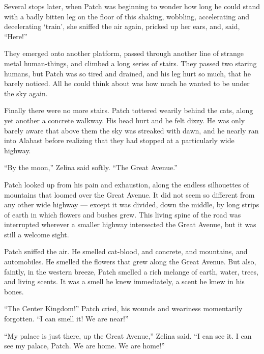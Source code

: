 \documentclass[ebook,oneside,openany,17pt]{memoir}
\newenvironment{tolerant}[1]{%
  \par\tolerance=#1\relax
}{%
  \par
}
\begin{document}
Several stops later, when Patch was beginning to wonder how long he
could stand with a badly bitten leg on the floor of this shaking,
wobbling, accelerating and decelerating ‘train’, she sniffed the air
again, pricked up her ears, and, said, “Here!”

\begin{tolerant}{2000}
They emerged onto another platform, passed through another line of
strange metal human-things, and climbed a long series of stairs. They
passed two staring humans, but Patch was so tired and drained, and his
leg hurt so much, that he barely noticed. All he could think about was
how much he wanted to be under the sky again.
\end{tolerant}

Finally there were no more stairs. Patch tottered wearily behind the
cats, along yet another a concrete walkway. His head hurt and he felt
dizzy. He was only barely aware that above them the sky was streaked
with dawn, and he nearly ran into Alabast before realizing that they
had stopped at a particularly wide highway.

“By the moon,” Zelina said softly. “The Great Avenue.”

\begin{tolerant}{2000}
Patch looked up from his pain and exhaustion, along the endless
silhouettes of mountains that loomed over the Great Avenue. It did not
seem so different from any other wide highway — except it was divided,
down the middle, by long strips of earth in which flowers and bushes
grew. This living spine of the road was interrupted wherever a smaller
highway intersected the Great Avenue, but it was still a welcome
sight.
\end{tolerant}

\begin{tolerant}{1000}
Patch sniffed the air. He smelled cat-blood, and concrete, and
mountains, and automobiles. He smell\-ed the flowers that grew along the
Great Avenue. But also, faintly, in the western breeze, Patch smelled
a rich melange of earth, water, trees, and living scents. It was a
smell he knew immediately, a scent he knew in his bones.
\end{tolerant}

“The Center Kingdom!” Patch cried, his wounds and weariness
momentarily forgotten. “I can smell it! We are near!”

“My palace is just there, up the Great Avenue,” Zelina said. “I can
see it. I can see my palace, Patch. We are home. We are home!”
\end{document}
